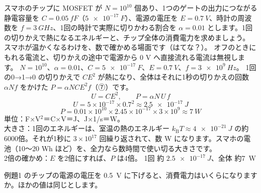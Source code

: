 \label{ph:原-10:ex1}
\begin{phreidai}
スマホのチップに MOSFET が $N=10^{10}$ 個あり、1つのゲートの出力につながる静電容量を $C=\qty{0.05}{fF}$（$\qty{5e-17}{F}$）、電源の電圧を $E=\qty{0.7}{V}$、時計の周波数を $f=\qty{3}{GHz}$、1回の時計で実際に切りかわる割合を $\alpha=0.01$ とします。1回の切りかえで熱になるエネルギーと、チップ全体の消費電力を求めましょう。
\phbamen
スマホが温かくなるわけを、数で確かめる場面です（はてな？）。
\phmushi
オフのときにもれる電流と、切りかえの途中で電源から 0 V へ直接流れる電流は無視します。
\phzu
$N=10^{10}$、$\alpha=0.01$、$C=\qty{5e-17}{F}$、$E=\qty{0.7}{V}$、$f=\qty{3e9}{Hz}$。
\phriyu
1回の0→1→0 の切りかえで $CE^2$ が熱になり、全体はそれに1秒の切りかえの回数 $\alpha Nf$ をかけた $P=\alpha NCE^2f$（⑦）です。
\phtateru
\[ U=CE^2,\qquad P=\alpha N\,U\,f \]
\phtoku
\[ U=5\times10^{-17}\times0.7^2\approx\qty{2.5e-17}{J} \]
\[ P=0.01\times10^{10}\times2.45\times10^{-17}\times3\times10^9\approx\qty{7}{W} \]
\phtashikame
単位：F×V$^2$＝C×V＝J、J×1/s＝W。\\
大きさ：1回のエネルギーは、室温の熱のエネルギー $k_{\mathrm B}T\approx\qty{4e-21}{J}$ の約6000倍。それが1秒に $3\times10^{17}$ 回繰り返されて、数 W になります。スマホの電池（10〜20 Wh ほど）を、全力なら数時間で使い切る大きさです。\\
2倍の確かめ：$E$ を2倍にすれば、$P$ は4倍。
\kotae 1回 約 $\qty{2.5e-17}{J}$、全体 約\qty{7}{W}
\end{phreidai}
\begin{jibun}
例題1 のチップの電源の電圧を \qty{0.5}{V} に下げると、消費電力はいくらになりますか。ほかの値は同じとします。
\end{jibun}

